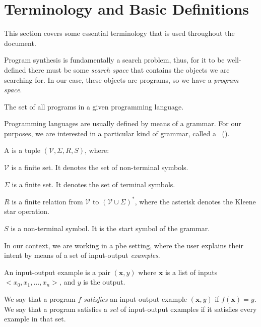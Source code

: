 \section{Terminology and Basic Definitions}
\label{sec:terminology}

This section covers some essential terminology that is used throughout the
document.

Program synthesis is fundamentally a search problem, thus, for it to be
well-defined there must be some \textit{search space} that contains the objects
we are searching for.
In our case, these objects are programs, so we have a \textit{program space}.

\begin{definition}
  The set of all programs in a given programming language.
\end{definition}

Programming languages are usually defined by means of a grammar.
For our purposes, we are interested in a particular kind of grammar, called a
~().

\begin{definition}
  A  is a tuple $(\mathcal{V}, \Sigma{}, R, S)$, where:
  \begin{enumerate*}[(1)]
  \item $\mathcal{V}$ is a finite set. It denotes the set of non-terminal symbols.
  \item $\Sigma{}$ is a finite set. It denotes the set of terminal symbols.
  \item $R$ is a finite relation from $\mathcal{V}$ to $(\mathcal{V} \cup
    \Sigma{})^*$, where the asterisk denotes the Kleene star operation.
  \item $S$ is a non-terminal symbol. It is the start symbol of the grammar.
  \end{enumerate*}
\end{definition}

In our context, we are working in a \gls{pbe} setting, where the user explains
their intent by means of a set of input-output \textit{examples}.

\begin{definition}
  An input-output example is a pair $(\mathbf{x}, y)$ where $\mathbf{x}$ is a
  list of inputs $<x_0, x_1, \ldots, x_n>$, and $y$ is the output.
\end{definition}

We say that a program $f$ \textit{satisfies} an input-output example
$(\mathbf{x}, y)$ if $f(\mathbf{x}) = y$.
We say that a program satisfies a \textit{set} of input-output examples if it
satisfies every example in that set.

